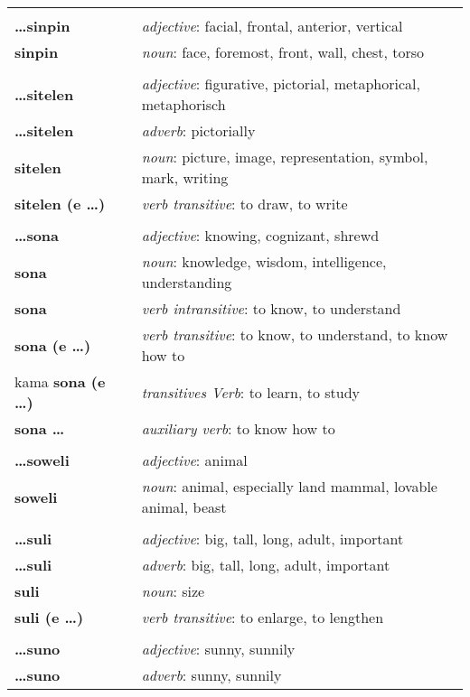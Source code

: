 \begin{supertabular}{p{2,5cm}|ll}
 && \\ %
\textbf{\dots sinpin} && \textit{adjective}: facial, frontal, anterior, vertical \\ 
\textbf{sinpin} && \textit{noun}: face, foremost, front, wall, chest, torso \\ 
 && \\ %
\textbf{\dots sitelen} && \textit{adjective}: figurative, pictorial, metaphorical, metaphorisch \\ 
\textbf{\dots sitelen} && \textit{adverb}: pictorially \\ 
\textbf{sitelen} && \textit{noun}: picture, image, representation, symbol, mark, writing \\ 
\textbf{sitelen (e \dots)} && \textit{verb transitive}: to draw, to write \\ 
 && \\ %
\textbf{\dots sona} && \textit{adjective}: knowing, cognizant, shrewd \\ 
\textbf{sona} && \textit{noun}: knowledge, wisdom, intelligence, understanding \\ 
\textbf{sona} && \textit{verb intransitive}: to know, to understand \\ 
\textbf{sona (e \dots)} && \textit{verb transitive}: to know, to understand, to know how to \\ 
kama \textbf{sona (e \dots)} && \textit{transitives Verb}: to learn, to study \\ 
\textbf{sona \dots} && \textit{auxiliary verb}: to know how to \\ 
 && \\ %
\textbf{\dots soweli} && \textit{adjective}: animal \\ 
\textbf{soweli} && \textit{noun}: animal, especially land mammal, lovable animal, beast \\ 
 && \\ %
\textbf{\dots suli} && \textit{adjective}: big, tall, long, adult, important \\ 
\textbf{\dots suli} && \textit{adverb}: big, tall, long, adult, important \\ 
\textbf{suli} && \textit{noun}: size \\ 
\textbf{suli (e \dots)} && \textit{verb transitive}: to enlarge, to lengthen \\ 
 && \\ %
\textbf{\dots suno} && \textit{adjective}: sunny, sunnily \\ 
\textbf{\dots suno} && \textit{adverb}: sunny, sunnily \\ 

\end{supertabular}
